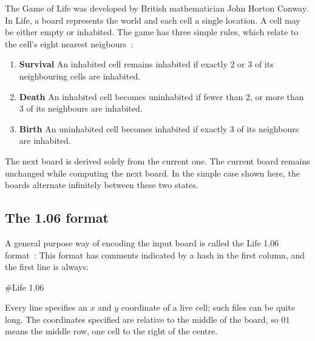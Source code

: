


The Game of Life was developed by British mathematician
John Horton Conway. In Life, a board represents the world
and each cell a single location. A cell may be either empty
or inhabited. The game has three simple rules, which relate to the
cell's eight nearest neigbours~:
\begin{enumerate}
\item {\bf Survival} An inhabited cell remains inhabited if
exactly $2$ or $3$ of its neighbouring cells are inhabited.
\item {\bf Death} An inhabited cell becomes uninhabited if 
fewer than $2$, or more than $3$ of its neighbours are inhabited.
\item {\bf Birth} An uninhabited cell becomes inhabited if exactly
$3$ of its neighbours are inhabited.
\end{enumerate}

The next board is derived solely from the current one. The current board
remains unchanged while computing the next board.  In the simple case
shown here, the boards alternate infinitely between these two states.

\begin{center}
\end{center}

\subsection*{The 1.06 format}

A general purpose way of encoding the input board is
called the Life 1.06 format~:
This format has comments indicated by a hash in the first column,
and the first line is always:
\begin{terminaloutput}
#Life 1.06
\end{terminaloutput}
Every line specifies an $x$ and $y$ coordinate of a live cell;
such files can be quite long.
The coordinates specified are relative to the middle of the board,
so $0 1$ means the middle row, one cell to the right of the centre.

